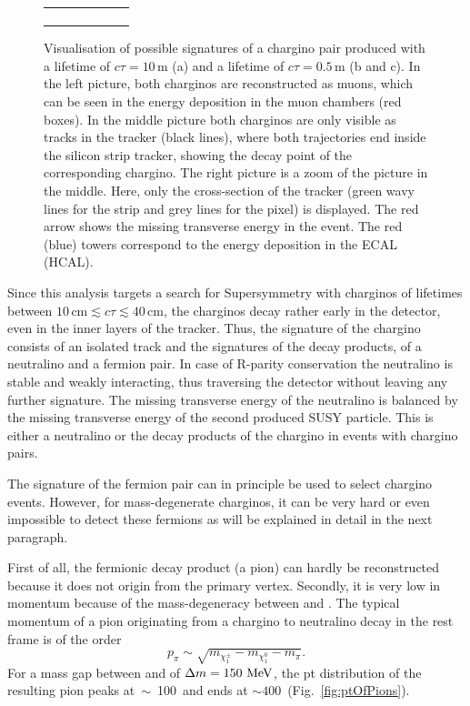\begin{figure}[!t]
\begin{tabular}{c}
\begin{subfigure}{0.31\textwidth}
      \caption{}
  \end{subfigure} 
  \end{tabular}
  \caption{Visualisation of possible signatures of a chargino pair produced with a lifetime of $c\tau = 10\,\text{m}$ (a) and a lifetime of $c\tau = 0.5\,\text{m}$ (b and c). 
           In the left picture, both charginos are reconstructed as muons, which can be seen in the energy deposition in the muon chambers (red boxes). 
           In the middle picture both charginos are only visible as tracks in the tracker (black lines), where both trajectories end inside the silicon strip tracker, showing the decay point of the corresponding chargino. 
           The right picture is a zoom of the picture in the middle. Here, only the cross-section of the tracker (green wavy lines for the strip and grey lines for the pixel) is displayed. The red arrow shows the missing transverse energy in the event.
           The red (blue) towers correspond to the energy deposition in the ECAL (HCAL).} 
  \label{fig:CharginoPaiEventDisplay}
\end{figure}

Since this analysis targets a search for Supersymmetry with charginos of lifetimes between $10\,\text{cm} \lesssim c\tau \lesssim  40\,\text{cm}$, the charginos decay rather early in the detector, even in the inner layers of the tracker. 
Thus, the signature of the chargino consists of an isolated track and the signatures of the decay products, \ie of a neutralino and a fermion pair. 
In case of R-parity conservation the neutralino is stable and weakly interacting, thus traversing the detector without leaving any further signature.
The missing transverse energy of the neutralino is balanced by the missing transverse energy of the second produced SUSY particle.
This is either a neutralino or the decay products of the chargino in events with chargino pairs. 

The signature of the fermion pair can in principle be used to select chargino events. 
However, for mass-degenerate charginos, it can be very hard or even impossible to detect these fermions as will be explained in detail in the next paragraph.

First of all, the fermionic decay product (\eg a pion) can hardly be reconstructed because it does not origin from the primary vertex.
Secondly, it is very low in momentum because of the mass-degeneracy between \chipm and \chiO.
The typical momentum of a pion originating from a chargino to neutralino decay in the \chipm rest frame is of the order 
\begin{equation*}
p_{\pi}\sim \sqrt{m_{\chi^{\pm}_1}-m_{\chi^{0}_1}-m_{\pi}}.
\end{equation*}
For a mass gap between \chipm and \chiO of $\Delta m=150\, \,\text{Me}\kern-0.06667em\text{V}$, the pt distribution of the resulting pion peaks \mbox{at $\sim$ 100\,\mev} and ends at \mbox{\pt $\sim 400\,$\mev} (Fig.~\ref{fig:ptOfPions}).

